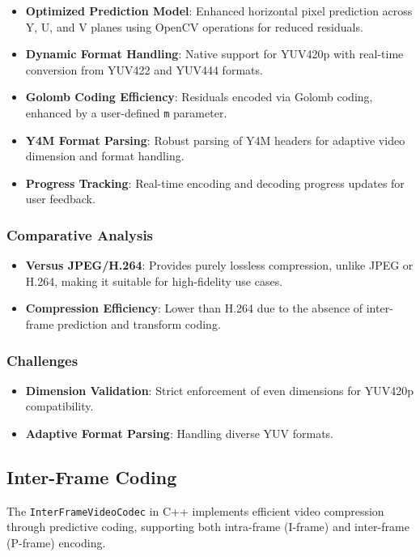 \documentclass[a4paper,14pt]{article}
\begin{document}
\begin{itemize}
\item \textbf{Optimized Prediction Model}: Enhanced horizontal pixel prediction across Y, U, and V planes using OpenCV operations for reduced residuals.
\item \textbf{Dynamic Format Handling}: Native support for YUV420p with real-time conversion from YUV422 and YUV444 formats.
\item \textbf{Golomb Coding Efficiency}: Residuals encoded via Golomb coding, enhanced by a user-defined \texttt{m} parameter.
\item \textbf{Y4M Format Parsing}: Robust parsing of Y4M headers for adaptive video dimension and format handling.
\item \textbf{Progress Tracking}: Real-time encoding and decoding progress updates for user feedback.
\end{itemize}

\subsubsection{Comparative Analysis}
\begin{itemize}
\item \textbf{Versus JPEG/H.264}: Provides purely lossless compression, unlike JPEG or H.264, making it suitable for high-fidelity use cases.
\item \textbf{Compression Efficiency}: Lower than H.264 due to the absence of inter-frame prediction and transform coding.
\end{itemize}

\subsubsection{Challenges}
\begin{itemize}
\item \textbf{Dimension Validation}: Strict enforcement of even dimensions for YUV420p compatibility.
\item \textbf{Adaptive Format Parsing}: Handling diverse YUV formats.
\end{itemize}

\subsection{Inter-Frame Coding}
The \texttt{InterFrameVideoCodec} in C++ implements efficient video compression through predictive coding, supporting both intra-frame (I-frame) and inter-frame (P-frame) encoding.
\end{document}
